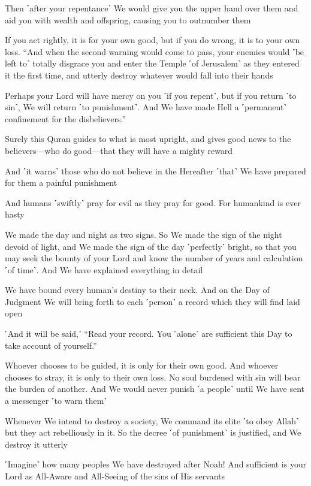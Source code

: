 Then ˹after your repentance˺ We would give you the upper hand over them and aid you with wealth and offspring, causing you to outnumber them

If you act rightly, it is for your own good, but if you do wrong, it is to your own loss. “And when the second warning would come to pass, your enemies would ˹be left to˺ totally disgrace you and enter the Temple ˹of Jerusalem˺ as they entered it the first time, and utterly destroy whatever would fall into their hands

Perhaps your Lord will have mercy on you ˹if you repent˺, but if you return ˹to sin˺, We will return ˹to punishment˺. And We have made Hell a ˹permanent˺ confinement for the disbelievers.”

Surely this Quran guides to what is most upright, and gives good news to the believers—who do good—that they will have a mighty reward

And ˹it warns˺ those who do not believe in the Hereafter ˹that˺ We have prepared for them a painful punishment

And humans ˹swiftly˺ pray for evil as they pray for good. For humankind is ever hasty

We made the day and night as two signs. So We made the sign of the night devoid of light, and We made the sign of the day ˹perfectly˺ bright, so that you may seek the bounty of your Lord and know the number of years and calculation ˹of time˺. And We have explained everything in detail

We have bound every human’s destiny to their neck. And on the Day of Judgment We will bring forth to each ˹person˺ a record which they will find laid open

˹And it will be said,˺ “Read your record. You ˹alone˺ are sufficient this Day to take account of yourself.”

Whoever chooses to be guided, it is only for their own good. And whoever chooses to stray, it is only to their own loss. No soul burdened with sin will bear the burden of another. And We would never punish ˹a people˺ until We have sent a messenger ˹to warn them˺

Whenever We intend to destroy a society, We command its elite ˹to obey Allah˺ but they act rebelliously in it. So the decree ˹of punishment˺ is justified, and We destroy it utterly

˹Imagine˺ how many peoples We have destroyed after Noah! And sufficient is your Lord as All-Aware and All-Seeing of the sins of His servants

